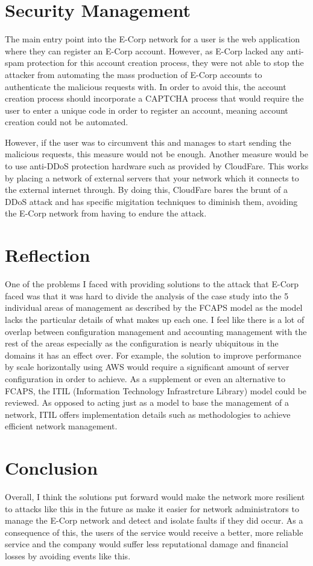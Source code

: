 \documentclass[]{report}
\begin{document}
\section*{Security Management}
The main entry point into the E-Corp network for a user is the web application where they can register an E-Corp account. However, as E-Corp lacked any anti-spam protection for this account creation process, they were not able to stop the attacker from automating the mass production of E-Corp accounts to authenticate the malicious requests with. In order to avoid this, the account creation process should incorporate a CAPTCHA process that would require the user to enter a unique code in order to register an account, meaning account creation could not be automated.

However, if the user was to circumvent this and manages to start sending the malicious requests, this measure would not be enough. Another measure would be to use anti-DDoS protection hardware such as provided by CloudFare. This works by placing a network of external servers that your network which it connects to the external internet through. By doing this, CloudFare bares the brunt of a DDoS attack and has specific migitation techniques to diminish them, avoiding the E-Corp network from having to endure the attack.

\section*{Reflection}
One of the problems I faced with providing solutions to the attack that E-Corp faced was that it was hard to divide the analysis of the case study into the 5 individual areas of management as described by the FCAPS model as the model lacks the particular details of what makes up each one. I feel like there is a lot of overlap between configuration management and accounting management with the rest of the areas especially as the configuration is nearly ubiquitous in the domains it has an effect over. For example, the solution to improve performance by scale horizontally using AWS would require a significant amount of server configuration in order to achieve. As a supplement or even an alternative to FCAPS, the ITIL (Information Technology Infrastrcture Library) model could be reviewed. As opposed to acting just as a model to base the management of a network, ITIL offers implementation details such as methodologies to achieve efficient network management.

\section*{Conclusion}
Overall, I think the solutions put forward would make the network more resilient to attacks like this in the future as make it easier for network administrators to manage the E-Corp network and detect and isolate faults if they did occur. As a consequence of this, the users of the service would receive a better, more reliable service and the company would suffer less reputational damage and financial losses by avoiding events like this.
\end{document}
